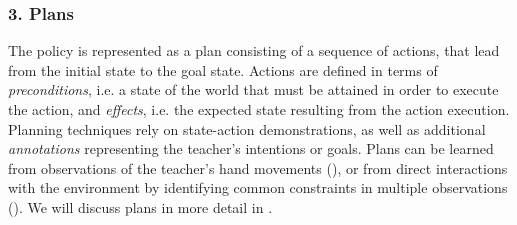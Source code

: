 \subsubsection{3. Plans}\label{sssec:Plans}
The policy is represented as a plan consisting of a sequence of actions, that lead from the initial state to the goal state.
Actions are defined in terms of \textit{preconditions}, i.e. a state of the world that must be attained in order to execute the action, and \textit{effects}, i.e. the expected state resulting from the action execution. 
Planning techniques rely on state-action demonstrations, as well as additional \textit{annotations} representing the teacher's intentions or goals.
Plans can be learned from observations of the teacher's hand movements (\cite{kuniyoshi1994learning}), or from direct interactions with the environment by identifying common constraints in multiple observations (\cite{ekvall2008robot}).
We will discuss plans in more detail in .


